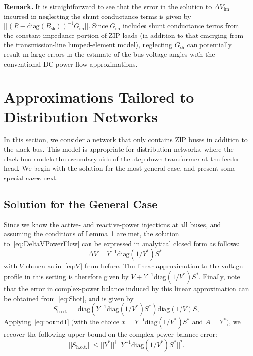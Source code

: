 \documentclass[10 pt, conference]{ieeeconf}
\begin{document}
\noindent \textbf{Remark.} It is straightforward to see that the error in the solution to $\Delta V_\mathrm{im}$ incurred in neglecting the shunt conductance terms is given by $||\left(B - \mathrm{diag}(B_\mathrm{sh}) \right)^{-1} G_\mathrm{sh}||$. Since $G_\mathrm{sh}$ includes shunt conductance terms from the constant-impedance portion of $\mathrm{ZIP}$ loads (in addition to that emerging from the transmission-line lumped-element model), neglecting $G_\mathrm{sh}$ can potentially result in large errors in the estimate of the bus-voltage angles with the conventional DC power flow approximations.

\section{Approximations Tailored to Distribution Networks} \label{sec:Distribution}
In this section, we consider a network that only contains $\mathrm{ZIP}$ buses in addition to the slack bus. This model is appropriate for distribution networks, where the slack bus models the secondary side of the step-down transformer at the feeder head. We begin with the solution for the most general case, and present some special cases next. 

\subsection{Solution for the General Case}
Since we know the active- and reactive-power injections at all buses, and assuming the conditions of Lemma~1 are met, the solution to~\eqref{eq:DeltaVPowerFlow} can be expressed in analytical closed form as follows:
\begin{equation} \label{eq:DeltaVPQ}
\Delta V =  Y^{-1}\mathrm{diag}\left(1/V^*\right) S^*, 
\end{equation}
with $V$ chosen as in~\eqref{eq:V} from before. The linear approximation to the voltage profile in this setting is therefore given by $V + Y^{-1}\mathrm{diag}\left(1/V^*\right) S^*$. Finally, note that the error in complex-power balance induced by this linear approximation can be obtained from~\eqref{eq:Shot}, and is given by
\begin{equation}
S_\mathrm{h.o.t.} = \mathrm{diag}\left(Y^{-1} \mathrm{diag}\left( 1/V^* \right) S^*\right) \mathrm{diag}\left(1 / V\right) S,
\label{eq:Shot_zip}
\end{equation}
Applying~\eqref{eq:bound1} (with the choice $x = Y^{-1} \mathrm{diag}\left( 1/V^* \right) S^*$ and $A = Y^*$), we recover the following upper bound on the complex-power-balance error:
\begin{equation}
||S_\mathrm{h.o.t.}|| \leq ||Y^*||^\dagger ||Y^{-1} \mathrm{diag}\left(1/V^*\right) S^*||^2.
\end{equation}
\end{document}
